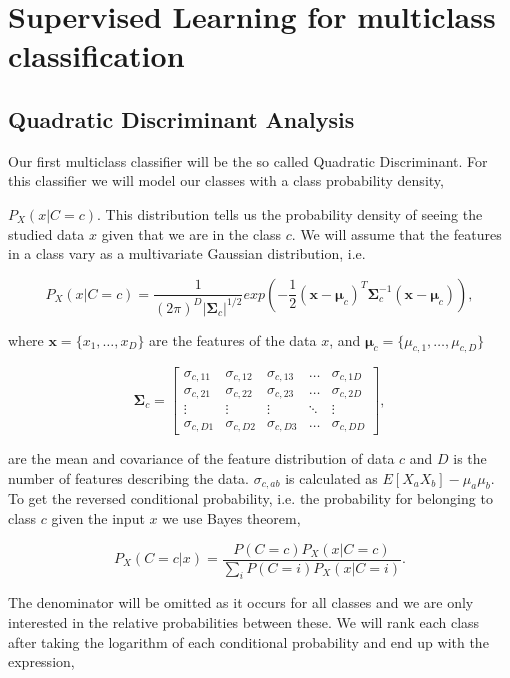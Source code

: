 \section{Supervised Learning for multiclass classification}

\subsection{Quadratic Discriminant Analysis}

Our first multiclass classifier will be the so called Quadratic Discriminant. For this classifier we will model our classes with a class probability density,

$P_X(x|C=c)$. This distribution tells us the probability density of seeing the studied data $x$ given that we are in the class $c$. We will assume that the features in a class vary as a multivariate Gaussian distribution, i.e.


\begin{equation}
P_X(x|C=c)=\frac{1}{(2\pi)^D|\bm{\Sigma}_c|^{1/2}}exp\left(-\frac{1}{2}(\bm{x}-\bm{\mu}_c)^{T}\bm{\Sigma}^{-1}_c(\bm{x}-\bm{\mu}_c)\right),
\end{equation}

where $\bm{x}=\{x_1,\dots,x_{D}\}$ are the features of the data $x$,  and
$\bm{\mu}_c=\{\mu_{c,1},\dots,\mu_{c,D}\}$

\[
\bm{\Sigma}_{c}=
\begin{bmatrix}
    \sigma_{c,11} & \sigma_{c,12} & \sigma_{c,13} & \dots  & \sigma_{c,1D} \\
    \sigma_{c,21} & \sigma_{c,22} & \sigma_{c,23} & \dots  & \sigma_{c,2D} \\
    \vdots & \vdots & \vdots & \ddots & \vdots \\
    \sigma_{c,D1} & \sigma_{c,D2} & \sigma_{c,D3} & \dots  & \sigma_{c,DD}
\end{bmatrix},\]

are the mean and covariance of the feature distribution of data $c$ and $D$ is the number of features describing the data. $\sigma_{c,ab}$ is calculated as $E[X_aX_b]-\mu_a\mu_b$. To get the reversed conditional probability, i.e. the probability for belonging to class $c$ given the input $x$ we use Bayes theorem,

\begin{equation}
P_X(C=c|x)= \frac{P(C=c)P_X(x|C=c)}{\sum_i{P(C=i)P_X(x|C=i)}}.
\end{equation}

The denominator will be omitted as it occurs for all classes and we are only interested in the relative probabilities between these. We will rank each class after taking the logarithm of each conditional probability and end up with the expression,

